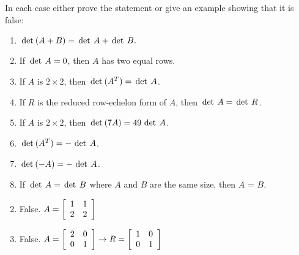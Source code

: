\begin{multicols}{2}
\begin{ex}
\begin{sol}
\begin{enumerate}[label={\alph*.}]
\end{enumerate}
\end{sol}
\end{ex}

\begin{ex}
In each case either prove the statement or give an example showing that it is false:


\begin{enumerate}[label={\alph*.}]
\item $\thinspace\operatorname{det\medspace}(A + B) = \thinspace\operatorname{det \medspace} A + \thinspace\operatorname{det \medspace} B.$

\item If $\thinspace\operatorname{det \medspace} A = 0$, then $A$ has two equal rows.

\item If $A$ is $2 \times 2$, then $\thinspace\operatorname{det\medspace}(A^T) = \thinspace\operatorname{det \medspace} A$.

\item If $R$ is the reduced row-echelon form of $A$, then $\thinspace\operatorname{det \medspace} A = \thinspace\operatorname{det \medspace} R$.

\item If $A$ is $2 \times 2$, then $\thinspace\operatorname{det\medspace}(7A) = 49 \thinspace\operatorname{det \medspace} A$.

\item $\thinspace\operatorname{det\medspace}(A^T) = - \thinspace\operatorname{det \medspace} A$.

\item $\thinspace\operatorname{det\medspace}(-A) = - \thinspace\operatorname{det \medspace} A$.

\item If $\thinspace\operatorname{det \medspace} A = \thinspace\operatorname{det \medspace} B$ where $A$ and $B$ are the same size, then $A$ = $B$.

\end{enumerate}
\begin{sol}
\begin{enumerate}[label={\alph*.}]
\setcounter{enumi}{1}
\item  False. $A = \left[ \begin{array}{rr}
1 & 1 \\
2 & 2 
\end{array} \right]$ 


\setcounter{enumi}{3}
\item  False. $A = \left[ \begin{array}{rr}
2 & 0 \\
0 & 1 
\end{array} \right] \rightarrow
R = \left[ \begin{array}{rr}
1 & 0 \\
0 & 1 
\end{array} \right]
$ 



\end{enumerate}
\end{sol}
\end{ex}
\end{multicols}
